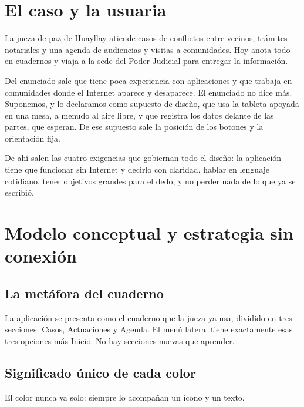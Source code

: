 \documentclass[11pt,a4paper]{article}
\begin{document}
\tableofcontents
\newpage

\section{El caso y la usuaria}

La jueza de paz de Huayllay atiende casos de conflictos entre vecinos, trámites notariales y una agenda de audiencias y visitas a comunidades. Hoy anota todo en cuadernos y viaja a la sede del Poder Judicial para entregar la información.

Del enunciado sale que tiene poca experiencia con aplicaciones y que trabaja en comunidades donde el Internet aparece y desaparece. El enunciado no dice más. Suponemos, y lo declaramos como supuesto de diseño, que usa la tableta apoyada en una mesa, a menudo al aire libre, y que registra los datos delante de las partes, que esperan. De ese supuesto sale la posición de los botones y la orientación fija.

De ahí salen las cuatro exigencias que gobiernan todo el diseño: la aplicación tiene que funcionar sin Internet y decirlo con claridad, hablar en lenguaje cotidiano, tener objetivos grandes para el dedo, y no perder nada de lo que ya se escribió.

\section{Modelo conceptual y estrategia sin conexión}

\subsection{La metáfora del cuaderno}

La aplicación se presenta como el cuaderno que la jueza ya usa, dividido en tres secciones: Casos, Actuaciones y Agenda. El menú lateral tiene exactamente esas tres opciones más Inicio. No hay secciones nuevas que aprender.

\subsection{Significado único de cada color}

El color nunca va solo: siempre lo acompañan un ícono y un texto.
\end{document}
